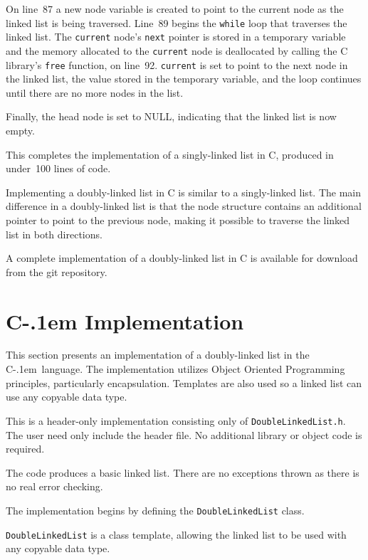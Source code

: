 \documentclass{article}
\newcommand{\Cpp}{\mbox{C\kern-.1em\raisebox{.35ex}{\smaller{\smaller{+\kern-0.05em+}}}}}
\begin{document}
  On line~87 a new node variable is created to point to the current node as the linked list is being traversed. Line~89 begins the \verb|while| loop that traverses the linked list. The \verb|current| node's \verb|next| pointer is stored in a temporary variable and the memory allocated to the \verb|current| node is deallocated by calling the C library's \verb|free| function, on line~92. \verb|current| is set to point to the next node in the linked list, the value stored in the temporary variable, and the loop continues until there are no more nodes in the list.

  Finally, the head node is set to NULL, indicating that the linked list is now empty.

  This completes the implementation of a singly-linked list in C, produced in under~100 lines of code.

  Implementing a doubly-linked list in C is similar to a singly-linked list. The main difference in a doubly-linked list is that the node structure contains an additional pointer to point to the previous node, making it possible to traverse the linked list in both directions.

  A complete implementation of a doubly-linked list in C is available for download from the git repository.

  \section{\texorpdfstring{\Cpp}{C++} Implementation}
  \label{sect:Cpp_implementation}
  This section presents an implementation of a doubly-linked list in the \Cpp\ language. The implementation utilizes Object Oriented Programming principles, particularly encapsulation. Templates are also used so a linked list can use any copyable data type.

  This is a header-only implementation consisting only of \verb|DoubleLinkedList.h|. The user need only include the header file. No additional library or object code is required.

  The code produces a basic linked list. There are no exceptions thrown as there is no real error checking.

  The implementation begins by defining the \verb|DoubleLinkedList| class.
  \begin{lstcpp}[firstnumber=1]
template<typename T>
class DoubleLinkedList {\end{lstcpp}
  \verb|DoubleLinkedList| is a class template, allowing the linked list to be used with any copyable data type.
\end{document}
